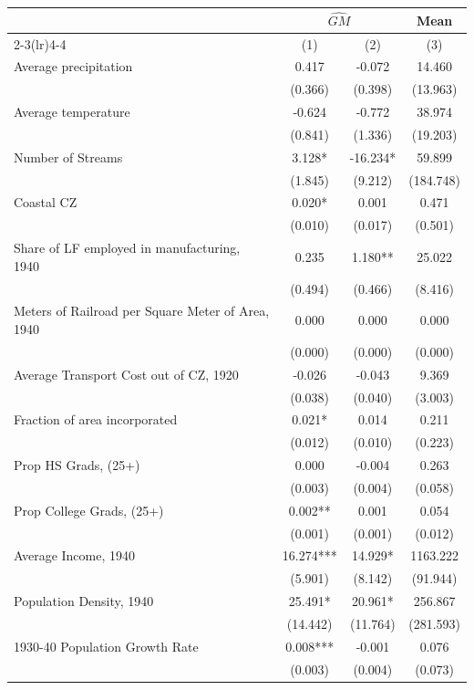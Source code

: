 \begin{tabular}{l*{3}{c}} \toprule
&\multicolumn{2}{c}{$\widehat{GM}$}&\multicolumn{1}{c}{Mean}\\\cmidrule(lr){2-3}\cmidrule(lr){4-4}
&\multicolumn{1}{c}{(1)}&\multicolumn{1}{c}{(2)}&\multicolumn{1}{c}{(3)}\\
\midrule 
Average precipitation  &    0.417 & -0.072 & 14.460 \\
                &  (0.366)  &  (0.398)  &  (13.963)    \\
Average temperature  &    -0.624 & -0.772 & 38.974 \\
                &  (0.841)  &  (1.336)  &  (19.203)    \\
Number of Streams  &    3.128* & -16.234* & 59.899 \\
                &  (1.845)  &  (9.212)  &  (184.748)    \\
Coastal CZ  &    0.020* & 0.001 & 0.471 \\
                &  (0.010)  &  (0.017)  &  (0.501)    \\
Share of LF employed in manufacturing, 1940  &    0.235 & 1.180** & 25.022 \\
                &  (0.494)  &  (0.466)  &  (8.416)    \\
Meters of Railroad per Square Meter of Area, 1940  &    0.000 & 0.000 & 0.000 \\
                &  (0.000)  &  (0.000)  &  (0.000)    \\
Average Transport Cost out of CZ, 1920  &    -0.026 & -0.043 & 9.369 \\
                &  (0.038)  &  (0.040)  &  (3.003)    \\
Fraction of area incorporated  &    0.021* & 0.014 & 0.211 \\
                &  (0.012)  &  (0.010)  &  (0.223)    \\
Prop HS Grads, (25+)  &    0.000 & -0.004 & 0.263 \\
                &  (0.003)  &  (0.004)  &  (0.058)    \\
Prop College Grads, (25+)  &    0.002** & 0.001 & 0.054 \\
                &  (0.001)  &  (0.001)  &  (0.012)    \\
Average Income, 1940  &    16.274*** & 14.929* & 1163.222 \\
                &  (5.901)  &  (8.142)  &  (91.944)    \\
Population Density, 1940  &    25.491* & 20.961* & 256.867 \\
                &  (14.442)  &  (11.764)  &  (281.593)    \\
1930-40 Population Growth Rate  &    0.008*** & -0.001 & 0.076 \\
                &  (0.003)  &  (0.004)  &  (0.073)    \\
\bottomrule \end{tabular}
